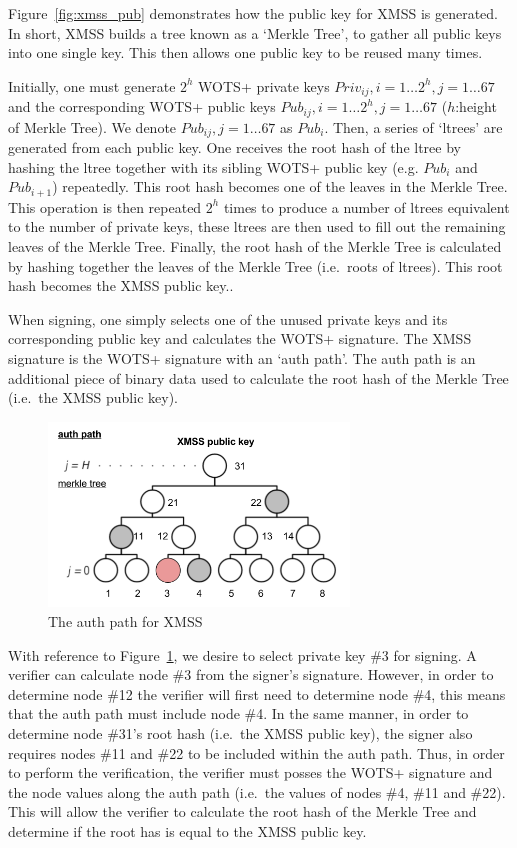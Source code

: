 \documentclass[a4paper,10pt,twocolumn]{article}
\begin{document}
Figure~\ref{fig:xmss_pub} demonstrates how the public key for XMSS is generated. In short, XMSS builds a tree known as a `Merkle Tree',
to gather all public keys into one single key. This then allows one public key to be reused many times.

Initially, one must generate \( 2^h \) WOTS+ private keys \( Priv_{ij}, i = 1 \ldots 2^h ,  j=1 \ldots 67\) and the
corresponding WOTS+ public keys \( Pub_{ij}, i = 1 \ldots 2^h , j=1 \ldots 67 \)  (\(h\):height of Merkle Tree). We denote \( Pub_{ij} , 
j=1 \ldots 67 \) as  \( Pub_{i} \). Then, a series of `ltrees' are generated from each public key. One receives the root hash of the 
ltree by hashing the ltree together with its sibling WOTS+ public key (e.g.  \( Pub_{i} \) and  \( Pub_{i+1} \)) repeatedly. This root 
hash becomes one of the leaves in the Merkle Tree. This operation is then repeated \( 2^h \) times to produce a number of ltrees 
equivalent to the number of private keys, these ltrees are then used to fill out the remaining leaves of the Merkle Tree. Finally, the 
root hash of the Merkle Tree is calculated by hashing together the leaves of the Merkle Tree (i.e.\ roots of ltrees). This root hash 
becomes the XMSS public key..

When signing, one simply selects one of the unused private keys and its corresponding public key and calculates the WOTS+ signature. The 
XMSS signature is the WOTS+ signature with an `auth path'. The auth path is an additional piece of binary data used to calculate the 
root hash of the Merkle Tree (i.e.\ the XMSS public key).

\begin{figure}[ht]
	\begin{center}
	\includegraphics[width=80mm]{auth_path.png}
	  \caption{The auth path for XMSS}
    \label{fig:xmss_auth}
	\end{center}
 \end{figure}

With reference to Figure~\ref{fig:xmss_auth}, we desire to select private key \#3 for signing. A verifier can calculate node \#3 from the 
signer's signature. However, in order to determine node \#12 the verifier will first need to determine node \#4, this means that the auth 
path must include node \#4. In the same manner, in order to determine node \#31's root hash (i.e.\ the XMSS public key), the signer also 
requires nodes \#11 and \#22 to be included within the auth path. Thus, in order to perform the verification, the verifier must posses the 
WOTS+ signature and the node values along the auth path (i.e.\ the values of nodes \#4, \#11 and \#22). This will allow the verifier to 
calculate the root hash of the Merkle Tree and determine if the root has is equal to the XMSS public key.
\end{document}
